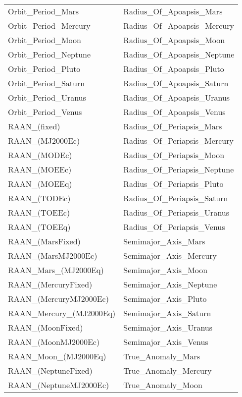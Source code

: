 \begin{table}[ht!]
\centering
    \begin{tabular}{ll}
    Orbit\_Period\_Mars & Radius\_Of\_Apoapsis\_Mars\\
    Orbit\_Period\_Mercury & Radius\_Of\_Apoapsis\_Mercury\\
    Orbit\_Period\_Moon & Radius\_Of\_Apoapsis\_Moon\\
    Orbit\_Period\_Neptune & Radius\_Of\_Apoapsis\_Neptune\\
    Orbit\_Period\_Pluto & Radius\_Of\_Apoapsis\_Pluto\\
    Orbit\_Period\_Saturn & Radius\_Of\_Apoapsis\_Saturn\\
    Orbit\_Period\_Uranus & Radius\_Of\_Apoapsis\_Uranus\\
    Orbit\_Period\_Venus & Radius\_Of\_Apoapsis\_Venus\\
    RAAN\_(fixed) & Radius\_Of\_Periapsis\_Mars\\
    RAAN\_(MJ2000Ec) & Radius\_Of\_Periapsis\_Mercury\\
    RAAN\_(MODEc) & Radius\_Of\_Periapsis\_Moon\\
    RAAN\_(MOEEc) & Radius\_Of\_Periapsis\_Neptune\\
    RAAN\_(MOEEq) & Radius\_Of\_Periapsis\_Pluto\\
    RAAN\_(TODEc) & Radius\_Of\_Periapsis\_Saturn\\
    RAAN\_(TOEEc) & Radius\_Of\_Periapsis\_Uranus\\
    RAAN\_(TOEEq) & Radius\_Of\_Periapsis\_Venus\\
    RAAN\_(MarsFixed) & Semimajor\_Axis\_Mars\\
    RAAN\_(MarsMJ2000Ec) & Semimajor\_Axis\_Mercury\\
    RAAN\_Mars\_(MJ2000Eq) & Semimajor\_Axis\_Moon\\
    RAAN\_(MercuryFixed) & Semimajor\_Axis\_Neptune\\
    RAAN\_(MercuryMJ2000Ec) & Semimajor\_Axis\_Pluto\\
    RAAN\_Mercury\_(MJ2000Eq) & Semimajor\_Axis\_Saturn\\
    RAAN\_(MoonFixed) & Semimajor\_Axis\_Uranus\\
    RAAN\_(MoonMJ2000Ec) & Semimajor\_Axis\_Venus\\
    RAAN\_Moon\_(MJ2000Eq) & True\_Anomaly\_Mars\\
    RAAN\_(NeptuneFixed) & True\_Anomaly\_Mercury\\
    RAAN\_(NeptuneMJ2000Ec) & True\_Anomaly\_Moon\\

\end{tabular}
\end{table}
